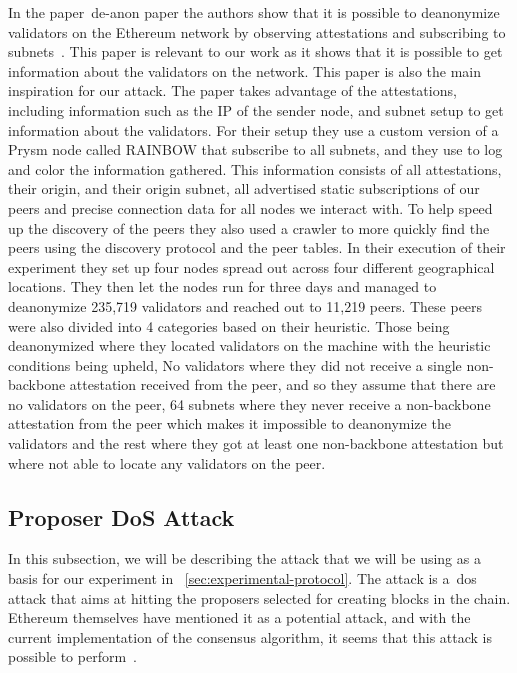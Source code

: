 In the paper~\gls{de-anon paper} the authors show that it is possible to deanonymize validators on the Ethereum network by observing attestations and subscribing to subnets~\cite{heimbach2024deanonymizingethereumvalidatorsp2p}.
This paper is relevant to our work as it shows that it is possible to get information about the validators on the network.
This paper is also the main inspiration for our attack.
The paper takes advantage of the attestations, including information such as the IP of the sender node, and subnet setup to get information about the validators.
For their setup they use a custom version of a Prysm node called RAINBOW that subscribe to all subnets, and they use to log and color the information gathered.
This information consists of all attestations, their origin, and their origin subnet, all advertised static subscriptions of our peers and precise connection data for all nodes we interact with.
To help speed up the discovery of the peers they also used a crawler to more quickly find the peers using the discovery protocol and the peer tables.
In their execution of their experiment they set up four nodes spread out across four different geographical locations.
They then let the nodes run for three days and managed to deanonymize 235,719 validators and reached out to 11,219 peers.
These peers were also divided into 4 categories based on their heuristic.
Those being deanonymized where they located validators on the machine with the heuristic conditions being upheld, No validators where they did not receive a single non-backbone attestation received from the peer, and so they assume that there are no validators on the peer, 64 subnets where they never receive a non-backbone attestation from the peer which makes it impossible to deanonymize the validators and the rest where they got at least one non-backbone attestation but where not able to locate any validators on the peer.




\subsection{Proposer DoS Attack}\label{subsec:proposer-dos-attack}
In this subsection, we will be describing the attack that we will be using as a basis for our experiment in ~\autoref{sec:experimental-protocol}.
The attack is a~\gls{dos} attack that aims at hitting the proposers selected for creating blocks in the chain.
Ethereum themselves have mentioned it as a potential attack, and with the current implementation of the consensus algorithm, it seems that this attack is possible to perform~\cite{EthereumSSLE2024,EthereumAttackDefense2024}.

